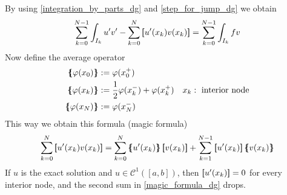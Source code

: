 By using \eqref{integration_by_parts_dg} and \eqref{step_for_jump_dg} we obtain 
\begin{equation}
    \sum_{k=0}^{N-1} \int_{I_k} u'v' - \sum_{k=0}^{N} \left[\mspace{-4mu}\left[u'(x_k)v(x_k)\right]\mspace{-4mu}\right] = \sum_{k=0}^{N-1} \int_{I_k} fv \label{almost_bilinear_dg}
\end{equation}
Now define the average operator 
\begin{align}
    \average{\phi(x_0)} &:= \phi(x^+_0) & \nonumber\\
    \average{\phi(x_k)} &:= \frac{1}{2}\phi(x_k^-) +\phi(x^+_k) & x_k : \txt{ interior node} \\
    \average{\phi(x_N)} &:= \phi(x^-_N) &\nonumber \label{average_function}
\end{align}
This way we obtain this formula (magic formula)
\begin{equation}
    \sum_{k=0}^{N} \jump{u'(x_k)v(x_k)} = \sum_{k=0}^{N} \average{u'(x_k)} \jump{v(x_k)} + \sum_{k=1}^{N-1} \jump{u'(x_k)}\average{v(x_k)}\label{magic_formula_dg}
\end{equation}
If \(u\) is the exact solution and \(u \in \mathcal{C}^1([a,b])\), then \(\left[\mspace{-4mu}\left[u'(x_k)\right]\mspace{-4mu}\right] = 0\) for every interior node, and the second sum in \eqref{magic_formula_dg} drops.

